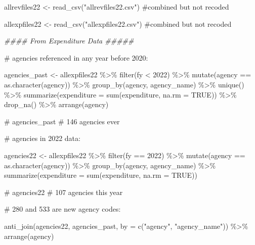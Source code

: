 \documentclass[
  letterpaper,
  DIV=11,
  numbers=noendperiod]{scrreport}
\newenvironment{Shaded}{\begin{snugshade}}{\end{snugshade}}
\newcommand{\AttributeTok}[1]{\textcolor[rgb]{0.40,0.45,0.13}{#1}}
\newcommand{\CommentTok}[1]{\textcolor[rgb]{0.37,0.37,0.37}{#1}}
\newcommand{\ConstantTok}[1]{\textcolor[rgb]{0.56,0.35,0.01}{#1}}
\newcommand{\DecValTok}[1]{\textcolor[rgb]{0.68,0.00,0.00}{#1}}
\newcommand{\DocumentationTok}[1]{\textcolor[rgb]{0.37,0.37,0.37}{\textit{#1}}}
\newcommand{\FunctionTok}[1]{\textcolor[rgb]{0.28,0.35,0.67}{#1}}
\newcommand{\NormalTok}[1]{\textcolor[rgb]{0.00,0.23,0.31}{#1}}
\newcommand{\OtherTok}[1]{\textcolor[rgb]{0.00,0.23,0.31}{#1}}
\newcommand{\SpecialCharTok}[1]{\textcolor[rgb]{0.37,0.37,0.37}{#1}}
\newcommand{\StringTok}[1]{\textcolor[rgb]{0.13,0.47,0.30}{#1}}
\begin{document}
\begin{Shaded}
\begin{Highlighting}[]
\NormalTok{allrevfiles22 }\OtherTok{\textless{}{-}} \FunctionTok{read\_csv}\NormalTok{(}\StringTok{"allrevfiles22.csv"}\NormalTok{) }\CommentTok{\#combined but not recoded}

\NormalTok{allexpfiles22 }\OtherTok{\textless{}{-}} \FunctionTok{read\_csv}\NormalTok{(}\StringTok{"allexpfiles22.csv"}\NormalTok{) }\CommentTok{\#combined but not recoded}


\DocumentationTok{\#\#\#\# From Expenditure Data \#\#\#\#\#}

\CommentTok{\# agencies referenced in any year before 2020:}

\NormalTok{agencies\_past }\OtherTok{\textless{}{-}}\NormalTok{ allexpfiles22 }\SpecialCharTok{\%\textgreater{}\%} 
  \FunctionTok{filter}\NormalTok{(fy }\SpecialCharTok{\textless{}} \DecValTok{2022}\NormalTok{) }\SpecialCharTok{\%\textgreater{}\%} 
  \FunctionTok{mutate}\NormalTok{(agency }\SpecialCharTok{==} \FunctionTok{as.character}\NormalTok{(agency)) }\SpecialCharTok{\%\textgreater{}\%} 
  \FunctionTok{group\_by}\NormalTok{(agency, agency\_name) }\SpecialCharTok{\%\textgreater{}\%} 
  \FunctionTok{unique}\NormalTok{() }\SpecialCharTok{\%\textgreater{}\%} 
  \FunctionTok{summarize}\NormalTok{(}\AttributeTok{expenditure =} \FunctionTok{sum}\NormalTok{(expenditure, }\AttributeTok{na.rm =} \ConstantTok{TRUE}\NormalTok{)) }\SpecialCharTok{\%\textgreater{}\%} 
  \FunctionTok{drop\_na}\NormalTok{() }\SpecialCharTok{\%\textgreater{}\%} 
  \FunctionTok{arrange}\NormalTok{(agency)}

\CommentTok{\# agencies\_past \# 146 agencies ever}

\CommentTok{\# agencies in 2022 data:}

\NormalTok{agencies22 }\OtherTok{\textless{}{-}}\NormalTok{ allexpfiles22  }\SpecialCharTok{\%\textgreater{}\%} 
  \FunctionTok{filter}\NormalTok{(fy }\SpecialCharTok{==} \DecValTok{2022}\NormalTok{) }\SpecialCharTok{\%\textgreater{}\%} 
  \FunctionTok{mutate}\NormalTok{(agency }\SpecialCharTok{==} \FunctionTok{as.character}\NormalTok{(agency)) }\SpecialCharTok{\%\textgreater{}\%} 
  \FunctionTok{group\_by}\NormalTok{(agency, agency\_name) }\SpecialCharTok{\%\textgreater{}\%} 
  \FunctionTok{summarize}\NormalTok{(}\AttributeTok{expenditure =} \FunctionTok{sum}\NormalTok{(expenditure, }\AttributeTok{na.rm =} \ConstantTok{TRUE}\NormalTok{))}

\CommentTok{\# agencies22 \# 107 agencies this year}

\CommentTok{\# 280 and 533 are new agency codes: }

\FunctionTok{anti\_join}\NormalTok{(agencies22, agencies\_past, }
          \AttributeTok{by =} \FunctionTok{c}\NormalTok{(}\StringTok{"agency"}\NormalTok{, }\StringTok{"agency\_name"}\NormalTok{)) }\SpecialCharTok{\%\textgreater{}\%} 
  \FunctionTok{arrange}\NormalTok{(agency)}
\end{Highlighting}
\end{Shaded}
\end{document}
